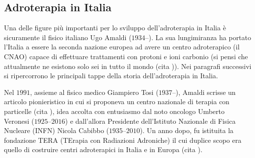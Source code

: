 \documentclass[12pt,a4paper,twoside]{report}
\begin{document}
	\subsection{Adroterapia in Italia}\label{sec:adroterapia_italia}
	Una delle figure più importanti per lo sviluppo dell'adroterapia in Italia è sicuramente il fisico italiano Ugo Amaldi ($1934$--). La sua lungimiranza ha portato l'Italia a essere la seconda nazione europea ad avere un centro adroterapico (il CNAO) capace di effettuare trattamenti con protoni e ioni carbonio (si pensi che attualmente ne esistono solo sei in tutto il mondo (cita
	)). Nei paragrafi successivi si ripercorrono le principali tappe della storia dell'adroterapia in Italia.
	
	Nel $1991$, assieme al fisico medico Giampiero Tosi ($1937$--), Amaldi scrisse un articolo pionieristico in cui si proponeva un centro nazionale di terapia con particelle (cita
	), idea accolta con entusiasmo dal noto oncologo Umberto Veronesi ($1925$--$2016$) e dall'allora Presidente dell'Istituto Nazionale di Fisica Nucleare (INFN) Nicola Cabibbo ($1935$--$2010$). Un anno dopo, fu istituita la fondazione TERA (TErapia con Radiazioni Adroniche) il cui duplice scopo era quello di costruire centri adroterapici in Italia e in Europa (cita
	).
	
\end{document}
